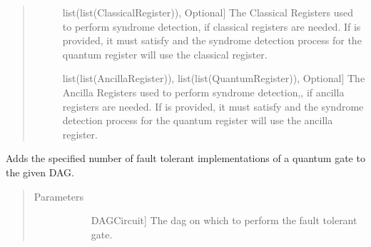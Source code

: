 \documentclass[letterpaper,10pt,english]{sphinxmanual}
\begin{document}
\begin{fulllineitems}
\begin{fulllineitems}
\begin{quote}
\begin{description}
\begin{description}
\item[{}] \leavevmode{[}list(list(ClassicalRegister)), Optional{]}
The Classical Registers used to perform syndrome detection, if classical registers are needed. If  is provided, it must satisfy  and the syndrome detection process for the  quantum register will use the  classical register.

\item[{}] \leavevmode{[}list(list(AncillaRegister)), list(list(QuantumRegister)), Optional{]}
The Ancilla Registers used to perform syndrome detection,, if ancilla registers are needed. If  is provided, it must satisfy  and the syndrome detection process for the  quantum register will use the  ancilla register.

\end{description}

\end{description}\end{quote}

\end{fulllineitems}


\begin{fulllineitems}
\label{\detokenize{Steane:Steane.SteaneFaultTolerantGates.addGateDag}}
Adds the specified number of fault tolerant implementations of a quantum gate to the given DAG.
\begin{quote}\begin{description}
\item[{Parameters}] \leavevmode\begin{description}
\item[{}] \leavevmode{[}DAGCircuit{]}
The dag on which to perform the fault tolerant gate.


\end{description}
\end{description}
\end{quote}
\end{fulllineitems}
\end{fulllineitems}
\end{document}
